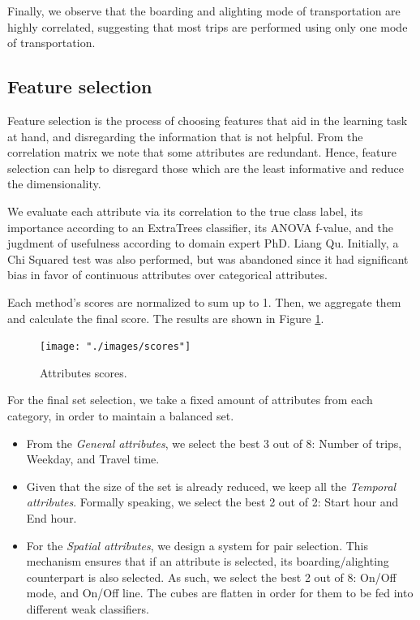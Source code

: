 \documentclass{article}
\begin{document}
Finally, we observe that the boarding and alighting mode of transportation are highly correlated, suggesting that most trips are performed using only one mode of transportation. 

\subsection{Feature selection}
Feature selection is the process of choosing features that aid in the learning task at hand, and disregarding the information that is not helpful. From the correlation matrix we note that some attributes are redundant. Hence, feature selection can help to disregard those which are the least informative and reduce the dimensionality.

We evaluate each attribute via its correlation to the true class label, its importance according to an ExtraTrees classifier, its ANOVA f-value, and the jugdment of usefulness according to domain expert PhD. Liang Qu. Initially, a Chi Squared test was also performed, but was abandoned since it had significant bias in favor of continuous attributes over categorical attributes. 

Each method's scores are normalized to sum up to 1. Then, we aggregate them and calculate the final score. The results are shown in Figure \ref{fig:classification/scores}. 

\begin{figure}[H]
  \centering
  \texttt{[image: "./images/scores"]}
  \caption{Attributes scores.}
  \label{fig:classification/scores}
\end{figure}

For the final set selection, we take a fixed amount of attributes from each category, in order to maintain a balanced set. 

\begin{itemize}

\item From the \textit{General attributes}, we select the best 3 out of 8: Number of trips, Weekday, and Travel time. 

\item Given that the size of the set is already reduced, we keep all the \textit{Temporal attributes}. Formally speaking, we select the best 2 out of 2: Start hour and End hour. 

\item For the \textit{Spatial attributes}, we design a system for pair selection. This mechanism ensures that if an attribute is selected, its boarding/alighting counterpart is also selected. As such, we select the best 2 out of 8: On/Off mode, and On/Off line. The cubes are flatten in order for them to be fed into different weak classifiers. 

\end{itemize}
\end{document}
